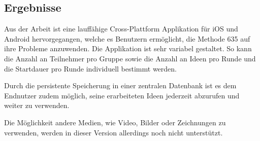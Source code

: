 \subsection{Ergebnisse}
Aus der Arbeit ist eine lauffähige Cross-Plattform Applikation für iOS und Android hervorgegangen, welche es Benutzern ermöglicht, die Methode 635 auf ihre Probleme anzuwenden. Die Applikation ist sehr variabel gestaltet. So kann die Anzahl an Teilnehmer pro Gruppe sowie die Anzahl an Ideen pro Runde und die Startdauer pro Runde individuell bestimmt werden. 

Durch die persistente Speicherung in einer zentralen Datenbank ist es dem Endnutzer zudem möglich, seine erarbeiteten Ideen jederzeit abzurufen und weiter zu verwenden. 

Die Möglichkeit andere Medien, wie Video, Bilder oder Zeichnungen zu verwenden, werden in dieser Version allerdings noch nicht unterstützt.
